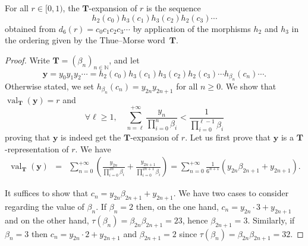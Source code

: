\documentclass[12pt,reqno]{amsart}
\DeclareMathOperator{\val}{val}
\begin{document}
\begin{theorem} \label{thm:TM23}
For all $r\in[0,1)$, the ${\mathbf{T}}$-expansion of $r$ is the sequence 
\[
    h_2(c_0)h_3(c_1)h_3(c_2)h_2(c_3)\cdots 
\]
obtained from $d_6(r)=c_0c_1c_2c_3\cdots$ by application of the morphisms $h_2$ and $h_3$ in the ordering given by the Thue--Morse word~${\mathbf{T}}$. 
\end{theorem}

\begin{proof}
Write ${\mathbf{T}}=(\beta_n)_{n\in\mathbb{N}}$, and let 
\[
    \mathbf{y}=y_0y_1y_2\cdots=h_2(c_0)h_3(c_1)h_3(c_2)h_2(c_3)\cdots h_{\beta_n}(c_n)\cdots.
\]
Otherwise stated, we set $h_{\beta_n}(c_n)=y_{2n}y_{2n+1}$ for all $n\ge 0$. We show that $\val_{\mathbf{T}}(\mathbf{y})=r$ and 
\[
    \forall\ell\ge 1,\quad  \sum_{n=\ell}^{+\infty} \frac{y_n}{\prod_{i=0}^n\beta_i}
    <\frac{1}{\prod_{i=0}^{\ell-1} \beta_i}
\]
proving that $\mathbf{y}$ is indeed get the ${\mathbf{T}}$-expansion of $r$. Let us first prove that $\mathbf{y}$ is a $\mathbf{T}$-representation of $r$. We have
\begin{eqnarray*}
    \val_{\mathbf{T}}(\mathbf{y}) 
    &=& \sum_{n= 0}^{+\infty}\left( \frac{y_{2n}}{\prod_{i=0}^{2n}\beta_i}
    +\frac{y_{2n+1}}{\prod_{i=0}^{2n+1}\beta_i}\right)
    =\sum_{n=0}^{+\infty}\frac{1}{6^{n+1}} (y_{2n}\beta_{2n+1}+y_{2n+1}).
\end{eqnarray*}

It suffices to show that $c_n=y_{2n}\beta_{2n+1}+y_{2n+1}$.
We have two cases to consider regarding the value of $\beta_n$. If $\beta_n=2$ then, on the one hand, $c_n= y_{2n}\cdot 3+y_{2n+1}$ and on the other hand, $\tau(\beta_n)=\beta_{2n}\beta_{2n+1}=23$, hence $\beta_{2n+1}=3$. Similarly, if $\beta_n=3$ then $c_n= y_{2n}\cdot 2+y_{2n+1}$ and $\beta_{2n+1}=2$ since $\tau(\beta_n)=\beta_{2n}\beta_{2n+1}=32$.


\end{proof}
\end{document}
